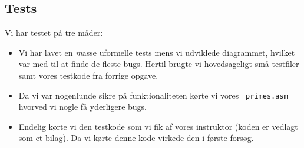 \subsection{Tests}
Vi har testet på tre måder:
\begin{itemize}
\item Vi har lavet en {\emph masse} uformelle tests mens vi udviklede
diagrammet, hvilket var med til at finde de fleste bugs. Hertil brugte vi
hovedsageligt små testfiler samt vores testkode fra forrige opgave.
\item Da vi var nogenlunde sikre på funktionaliteten kørte vi vores {\tt
primes.asm} hvorved vi nogle få yderligere bugs.
\item Endelig kørte vi den testkode som vi fik af vores instruktor (koden er
vedlagt som et bilag). Da vi kørte denne kode virkede den i første forsøg.
\end{itemize}
